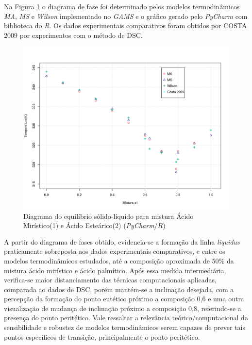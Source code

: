 Na Figura \ref{fig:3} o diagrama de fase foi determinado pelos modelos termodinâmicos \textit{MA}, \textit{MS} e \textit{Wilson} implementado no \textit{GAMS} e o gráfico gerado pelo \textit{PyCharm} com biblioteca do \textit{R}. Os dados experimentais comparativos foram obtidos por COSTA 2009 por experimentos com o método de DSC.
\begin{figure}[H]
	\centering
	\includegraphics[width=1.06\linewidth 
	]{dados/figuras/Miristico_estearico.png}
	\caption[Diagrama do equilíbrio sólido-líquido para mistura Ácido Mirístico e Ácido Esteárico]{Diagrama do equilíbrio sólido-líquido para mistura Ácido Mirístico(1) e Ácido Esteárico(2) (\textit{PyCharm}/$R$)}
	\label{fig:3}
\end{figure}

A partir do diagrama de fases obtido, evidencia-se a formação da linha \textit{liquidus} praticamente sobreposta aos dados experimentais comparativos, e entre os modelos termodinâmicos estudados, até a composição aproximada de 50\% da mistura ácido mirístico e ácido palmítico. Após essa medida intermediária, verifica-se maior distanciamento das técnicas computacionais aplicadas, comparada ao dados de DSC, porém mantém-se a inclinação desejada, com a percepção da formação do ponto eutético próximo a composição 0,6 e uma outra visualização de mudança de inclinação próximo a composição 0,8, referindo-se a presença do ponto peritético. Vale ressaltar a relevância teórico/computacional da sensibilidade e robustez de modelos termodinâmicos serem capazes de prever tais pontos específicos de transição, principalmente o ponto peritético.

